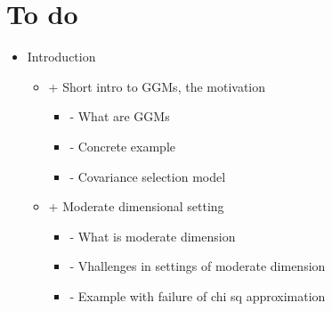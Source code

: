 \section*{To do}

\begin{itemize}

\item {\color{red} Introduction
\begin{itemize}
    \item{+ Short intro to GGMs, the motivation
    \begin{itemize}
        \item- What are GGMs
        \item- Concrete example
        \item- Covariance selection model
    \end{itemize}}
    \item{+ Moderate dimensional setting
    \begin{itemize}
        \item- What is moderate dimension
        \item- Vhallenges in settings of moderate dimension
        \item- Example with failure of chi sq approximation
    \end{itemize}}
    

\end{itemize}}
\end{itemize}

